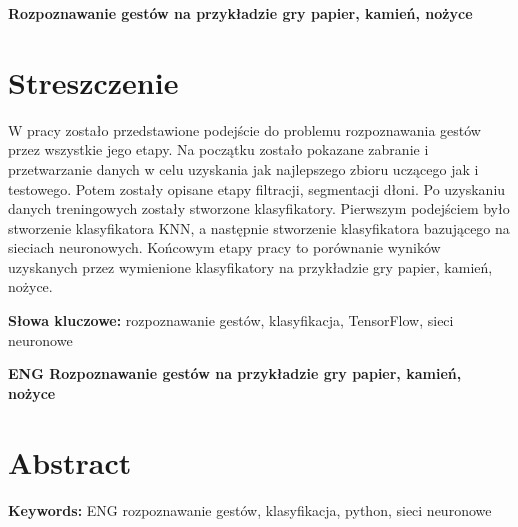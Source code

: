 \newpage
\begin{center}
\large \bf
Rozpoznawanie gestów na przykładzie gry papier, kamień, nożyce
\end{center}

\section*{Streszczenie}
W pracy zostało przedstawione podejście do problemu rozpoznawania gestów przez wszystkie jego etapy. Na początku zostało pokazane zabranie i przetwarzanie danych w celu uzyskania jak najlepszego zbioru uczącego jak i testowego. Potem zostały opisane etapy filtracji, segmentacji dłoni. Po uzyskaniu danych treningowych zostały stworzone klasyfikatory. Pierwszym podejściem było stworzenie klasyfikatora KNN, a następnie stworzenie klasyfikatora bazującego na sieciach neuronowych. Końcowym etapy pracy to porównanie wyników uzyskanych przez wymienione klasyfikatory na przykładzie gry papier, kamień, nożyce.

\bigskip
{\noindent\bf Słowa kluczowe:} rozpoznawanie gestów, klasyfikacja, TensorFlow, sieci neuronowe

\vskip 2cm


\begin{center}
\large \bf
ENG Rozpoznawanie gestów na przykładzie gry papier, kamień, nożyce
\end{center}

\section*{Abstract}

\bigskip
{\noindent\bf Keywords:} ENG rozpoznawanie gestów, klasyfikacja, python, sieci neuronowe

\vfill